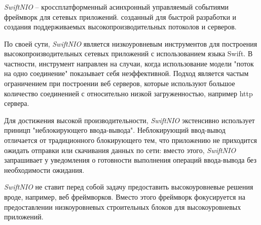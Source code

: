 \subsubsection{}
\label{sec:development:arch:pp:nio}

\textit{SwiftNIO} -- кроссплатформенный асинхронный управляемый событиями фреймворк для сетевых приложений. созданный для быстрой разработки и создания поддерживаемых высокопроизводительных потоколов и серверов\cite{nio:github}.

По своей сути, \textit{SwiftNIO} является низкоуровневым инструментов для построения высокопроизводительных сетевых приложений с использованием языка Swift. В частности, инструмент направлен на случаи, когда использование модели "поток на одно соединение" показывает себя неэффективной. Подход является частым ограничением при построении веб серверов, которые используют большое количество соединенией с относительно низкой загруженностью, например \gls{http} сервера.

Для достижения высокой производительности, \textit{SwiftNIO} экстенсивно использует приницп "неблокирующего ввода-вывода". Неблокирующий ввод-вывод отличается от традиционного блокирующего тем, что приложению не приходится ожидать отправки или скачивания данных по сети: вместо этого, \textit{SwiftNIO} запрашивает у уведомления о готовности выполнения операций ввода-вывода без необходимости ожидания.

\textit{SwiftNIO} не ставит перед собой задачу предоставить высокоуровневые решения вроде, например, веб фреймворков. Вместо этого фреймворк фокусируется на предоставлении низкоуровневых строительных блоков для высокоуровневых приложений.
